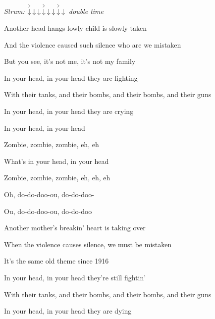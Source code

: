 \begin{song}


\begin{headerbox}
\RaiseBoxWithAccents
\textit{Strum:} $\AccentDown\Down\Down\AccentDown\Down\Down\AccentDown\Down$ \textit{double time}
\end{headerbox}

\begin{hchordbox}
\end{hchordbox}

\Large

\bigskip

 Another head hangs lowly child is slowly taken \par
{} And the violence caused such silence who are we mistaken \par

\bigskip

But you see, it’s not me, it’s not my family \par
In your head, in your head they are fighting \par
With their tanks, and their bombs, and their bombs, and their guns \par
In your head, in your head they are crying \par

\bigskip

In your head, in your head \par
Zombie, zombie, zombie, eh, eh \par
What’s in your head, in your head \par
Zombie, zombie, zombie, eh, eh, eh \par
{}Oh, do-do-doo-ou, do-do-doo- \par
{}Ou, do-do-doo-ou, do-do-doo  \par
 
\bigskip

 Another mother’s breakin’ heart is taking over \par
{} When the violence causes silence, we must be mistaken \par

\bigskip

It’s the same old theme since 1916 \par
In your head, in your head they’re still fightin’ \par
With their tanks, and their bombs, and their bombs, and their guns \par
In your head, in your head they are dying \par
 

\end{song}
